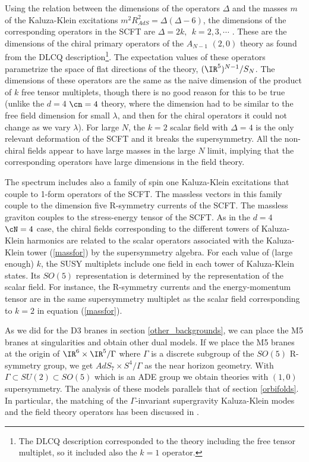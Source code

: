 Using the relation between the dimensions of the operators $\Delta$
and the masses $m$ of the Kaluza-Klein excitations $m^2 R_{AdS}^2 =
\Delta(\Delta-6)$, the dimensions of the corresponding operators in
the SCFT are $\Delta=2k,~~k=2,3,\cdots$
\cite{Aharony:1998mt, Minwalla:1998po,Leigh:1998tl,Halyo:1998so}.
These are the dimensions of the chiral primary operators of the
$A_{N-1}$ $(2,0)$ theory as found from the DLCQ
description\footnote{The DLCQ description corresponded to the theory
including the free tensor multiplet, so it included also the $k=1$
operator.}. The expectation values of these operators parametrize the
space of flat directions of the theory, $(\IR^5)^{N-1}/S_N$. The
dimensions of these operators are the same as the naive dimension of
the product of $k$ free tensor multiplets, though there is no good
reason for this to be true (unlike the $d=4$ $\cn=4$ theory, where the
dimension had to be similar to the free field dimension for small
$\lambda$, and then for the chiral operators it could not change as we
vary $\lambda$). For large $N$, the $k=2$ scalar field with $\Delta=4$
is the only relevant deformation of the SCFT and it breaks the
supersymmetry.  All the non-chiral fields appear to have large masses
in the large $N$ limit, implying that the corresponding operators have
large dimensions in the field theory.

The spectrum includes also a family of spin one Kaluza-Klein
excitations that couple to 1-form operators of the SCFT.  The massless
vectors in this family couple to the dimension five R-symmetry
currents of the SCFT.  The massless graviton couples to the
stress-energy tensor of the SCFT.  As in the $d=4$ $\cN=4$ case, the
chiral fields corresponding to the different towers of Kaluza-Klein
harmonics are related to the scalar operators associated with the
Kaluza-Klein tower (\ref{massfor}) by the supersymmetry algebra.  For
each value of (large enough) $k$, the SUSY multiplets include one
field in each tower of Kaluza-Klein states.  Its $SO(5)$
representation is determined by the representation of the scalar
field.  For instance, the R-symmetry currents and the energy-momentum
tensor are in the same supersymmetry multiplet as the scalar
field corresponding to $k=2$ in equation (\ref{massfor}).

As we did for the D3 branes in section \ref{other_backgrounds}, we can place
the M5 branes at singularities and obtain other dual models.  If we
place the M5 branes at the origin of $\IR^6 \times \IR^5/\Gamma$ where
$\Gamma$ is a discrete subgroup of the $SO(5)$ R-symmetry group, we get
$AdS_7 \times S^4/\Gamma$ as the near horizon geometry. With $\Gamma
\subset SU(2) \subset SO(5)$ which is an ADE group we obtain 
theories with $(1,0)$ supersymmetry.  The analysis of these models
parallels that of section \ref{orbifolds}.  In particular, the
matching of the $\Gamma$-invariant supergravity Kaluza-Klein modes and
the field theory operators has been discussed in \cite{Ahn:1998oa}.

